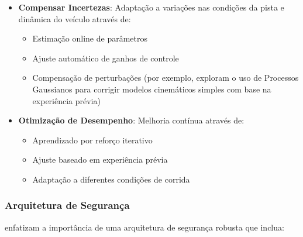 \begin{itemize}
    \item \textbf{Compensar Incertezas}: Adaptação a variações nas condições da pista e dinâmica do veículo através de:
          \begin{itemize}
              \item Estimação online de parâmetros
              \item Ajuste automático de ganhos de controle
              \item Compensação de perturbações (por exemplo, \cite{Jain2020Bayesrace} exploram o
                    uso de Processos Gaussianos para corrigir modelos cinemáticos simples com base
                    na experiência prévia)
          \end{itemize}

    \item \textbf{Otimização de Desempenho}: Melhoria contínua através de:
          \begin{itemize}
              \item Aprendizado por reforço iterativo
              \item Ajuste baseado em experiência prévia
              \item Adaptação a diferentes condições de corrida
          \end{itemize}
\end{itemize}

\subsubsection{Arquitetura de Segurança}

\cite{Ivanov2020Verifying} enfatizam a importância de uma arquitetura de segurança robusta que inclua:

